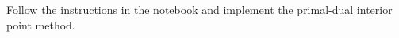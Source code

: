 \begin{exercise}[subtitle={Notebook}]
Follow the instructions in the notebook and implement the primal-dual interior point method.
\end{exercise}




